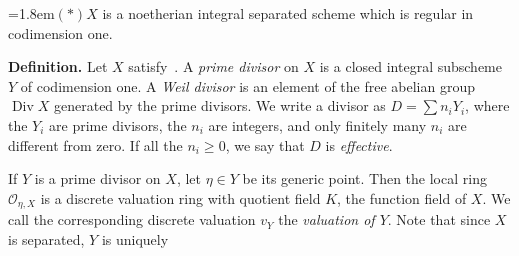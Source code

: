 {\noindent\hangindent=1.8em\hypertarget{cond-II-6-star}{}$(*)$\enspace $X$ is a noetherian integral separated scheme which is regular in codimension one.

\medskip
\noindent\textbf{Definition.} Let $X$ satisfy~. A \emph{prime divisor} on $X$ is a closed integral subscheme $Y$ of codimension one. A \emph{Weil divisor} is an element of the free abelian group $\operatorname{Div} X$ generated by the prime divisors. We write a divisor as $D=\sum n_iY_i$, where the $Y_i$ are prime divisors, the $n_i$ are integers, and only finitely many $n_i$ are different from zero. If all the $n_i\ge0$, we say that $D$ is \emph{effective}.

If $Y$ is a prime divisor on $X$, let $\eta\in Y$ be its generic point. Then the local ring $\mathcal O_{\eta,X}$ is a discrete valuation ring with quotient field $K$, the function field of $X$. We call the corresponding discrete valuation $v_Y$ the \emph{valuation of $Y$}. Note that since $X$ is separated, $Y$ is uniquely}
